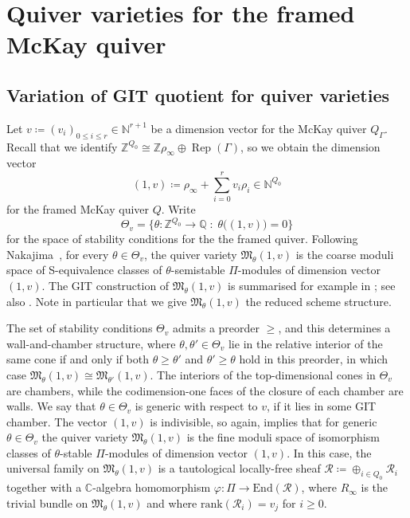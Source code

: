 \documentclass[pdftex]{sigma}%
\newcommand{\SC}{\mathbb{C}} %
\newcommand{\Rep}{\operatorname{Rep}}
\numberwithin{equation}{section}
\begin{document}
\section{Quiver varieties for the framed McKay quiver}\label{sec:quivers}

\subsection{Variation of GIT quotient for quiver varieties}
\label{subsec:quivervars}

Let $v\coloneqq(v_i)_{0 \leq i \leq r} \in \mathbb{N}^{r+1}$ be a dimension vector for the McKay quiver $Q_\Gamma$.
Recall that we identify $\mathbb{Z}^{Q_0}\cong \mathbb{Z}\rho_{\infty}\oplus \Rep(\Gamma)$, so we obtain the
dimension vector \[(1,v) \coloneqq\rho_{\infty}+\sum_{i=0}^r v_i\rho_i \in \mathbb{N}^{Q_0}
\] for the framed McKay quiver $Q$. Write
\[ \Theta_{v}=\big\{\theta\colon \mathbb{Z}^{Q_0} \to \mathbb{Q}\; : \; \theta\big((1,v)\big)=0 \big\} \]
for the space of stability conditions for the
the framed quiver. Following Nakajima~\cite{nakajima1994instantons, Nakajima98}, for every $\theta \in \Theta_{v}$, the quiver variety $\mathfrak{M}_{\theta}(1,v)$ is the coarse moduli space of S-equivalence classes of $\theta$-semistable $\Pi$-modules of dimension vector $(1,v)$. The GIT construction of $\mathfrak{M}_{\theta}(1,v)$ is summarised for example in \cite[Section 2]{craw2019punctual}; see also \cite[Section 2]{nakajima2009quiver}. Note in particular that we give $\mathfrak{M}_{\theta}(1,v)$ the reduced scheme structure.


The set of stability conditions $\Theta_v$ admits a preorder $\geq$, and this determines a wall-and-chamber structure, where
$\theta,\theta' \in \Theta_v$ lie in the relative interior of the same cone if and only if both $\theta \geq \theta'$ and $\theta' \geq\theta$ hold in this preorder, in which case $\mathfrak{M}_{\theta}(1,v)\cong\mathfrak{M}_{\theta'}(1,v)$. The interiors of the top-dimensional cones in $\Theta_v$ are chambers, while the codimension-one faces of the closure of each chamber are walls. We say that $\theta \in \Theta_v$ is generic with respect to $v$, if it lies in some GIT chamber. The vector $(1,v)$ is indivisible, so again, \cite[Proposition~5.3]{king1994moduli} implies that for generic $\theta \in \Theta_v$ the quiver variety $\mathfrak{M}_{\theta}(1,v)$ is the fine moduli space of isomorphism classes of $\theta$-stable $\Pi$-modules of dimension vector $(1,v)$. In this case, the universal family on $\mathfrak{M}_{\theta}(1,v)$ is a tautological locally-free sheaf $\mathcal{R} \coloneqq \oplus_{i \in Q_0}\mathcal{R}_i$ together with a $\SC$-algebra homomorphism $\varphi \colon \Pi \to \mathrm{End}(\mathcal{R})$, where $R_\infty$ is the trivial bundle on $\mathfrak{M}_{\theta}(1,v)$ and where $\mathrm{rank}(\mathcal{R}_i) = v_j$ for $i \geq 0$.
\end{document}
